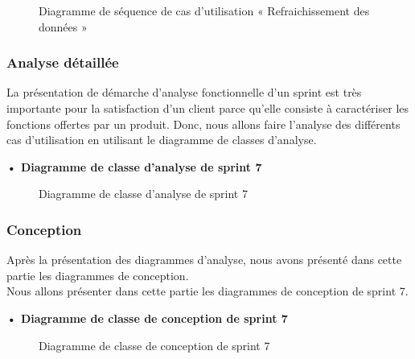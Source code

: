 \begin{figure}[H]
  \centering
  \caption{Diagramme de séquence de cas d'utilisation « Refraichissement des données »}
  \label{fig:sequence_refresh_data}
\end{figure}


\subsubsection{Analyse détaillée}
La présentation de démarche d'analyse fonctionnelle d'un sprint est très importante pour la satisfaction d'un client parce qu'elle consiste à caractériser les fonctions offertes par un produit.
Donc, nous allons faire l'analyse des différents cas d'utilisation en utilisant le diagramme de classes d'analyse.


\setlength{\parskip}{1em}
\setlength{\parindent}{0em}

\textbf{•	Diagramme de classe d'analyse de sprint 7 }


\begin{figure}[H]
  \centering
  \caption{Diagramme de classe d'analyse de sprint 7}
  \label{fig:class_analyse_sprint7}
\end{figure}


\subsubsection{Conception}

Après la présentation des diagrammes d'analyse, nous avons présenté dans cette partie les diagrammes de conception.\\ 
Nous allons présenter dans cette partie les diagrammes de conception de sprint 7. \\
\begin{landscape}

\textbf{•	Diagramme de classe de conception de sprint 7}

\begin{figure}[H]
  \centering
  \caption{Diagramme de classe de conception de sprint 7}
  \label{fig:class_diagram_5}
\end{figure}
\end{landscape}


